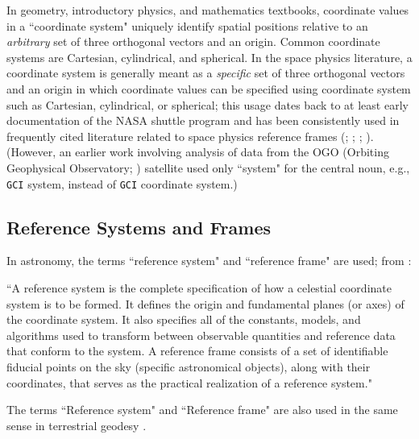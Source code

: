\documentclass[draft]{agujournal2019}
\begin{document}
In geometry, introductory physics, and mathematics textbooks, coordinate values in a ``coordinate system" uniquely identify spatial positions relative to an {\it arbitrary} set of three orthogonal vectors and an origin. Common coordinate systems are Cartesian, cylindrical, and spherical. In the space physics literature, a coordinate system is generally meant as a {\it specific} set of three orthogonal vectors and an origin in which coordinate values can be specified using coordinate system such as Cartesian, cylindrical, or spherical; this usage dates back to at least early documentation of the NASA shuttle program \cite{Davis1974} and has been consistently used in frequently cited literature related to space physics reference frames (; ; ; ). (However, an earlier work involving analysis of data from the OGO (Orbiting Geophysical Observatory; ) satellite used only ``system" for the central noun, e.g., \texttt{GCI} system, instead of \texttt{GCI} coordinate system.)


\subsection{Reference Systems and Frames}
\label{sect:refsystems}

In astronomy, the terms ``reference system" and ``reference frame" are used; from :

``A reference system is the complete specification of how a celestial coordinate system is to be formed. It defines the origin and fundamental planes (or axes) of the coordinate system. It also specifies all of the constants, models, and algorithms used to transform between observable quantities and reference data that conform to the system. A reference frame consists of a set of identifiable fiducial points on the sky (specific astronomical objects), along with their coordinates, that serves as the practical realization of a reference system."

The terms ``Reference system" and ``Reference frame" are also used in the same sense in terrestrial geodesy \cite{Seitz2014}.

\end{document}
